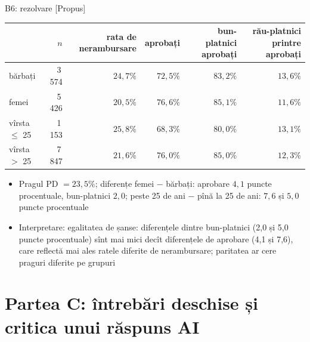\ifsolutions
\begin{frame}{B6: rezolvare [Propus]}
\itemsize{\footnotesize}
\begin{center}
\scriptsize
\begin{tabular}{lrrrrr}
\toprule
& $n$ & rata de nerambursare & aprobați & bun-platnici aprobați & rău-platnici printre aprobați \\
\midrule
bărbați & 3\,574 & $24{,}7\%$ & $72{,}5\%$ & $83{,}2\%$ & $13{,}6\%$ \\
femei & 5\,426 & $20{,}5\%$ & $76{,}6\%$ & $85{,}1\%$ & $11{,}6\%$ \\
vîrsta $\le$ 25 & 1\,153 & $25{,}8\%$ & $68{,}3\%$ & $80{,}0\%$ & $13{,}1\%$ \\
vîrsta $>$ 25 & 7\,847 & $21{,}6\%$ & $76{,}0\%$ & $85{,}0\%$ & $12{,}3\%$ \\
\bottomrule
\end{tabular}
\end{center}
\begin{itemize}
    \item Pragul PD $= 23{,}5\%$; diferențe femei $-$ bărbați: aprobare $4{,}1$ puncte procentuale, bun-platnici $2{,}0$; peste 25 de ani $-$ pînă la 25 de ani: $7{,}6$ și $5{,}0$ puncte procentuale
    \item Interpretare: egalitatea de șanse: diferențele dintre bun-platnici (2{,}0 și 5{,}0 puncte procentuale) sînt mai mici decît diferențele de aprobare (4{,}1 și 7{,}6), care reflectă mai ales ratele diferite de nerambursare; paritatea ar cere praguri diferite pe grupuri
\end{itemize}
\end{frame}
\fi


\section{Partea C: întrebări deschise și critica unui răspuns AI}

